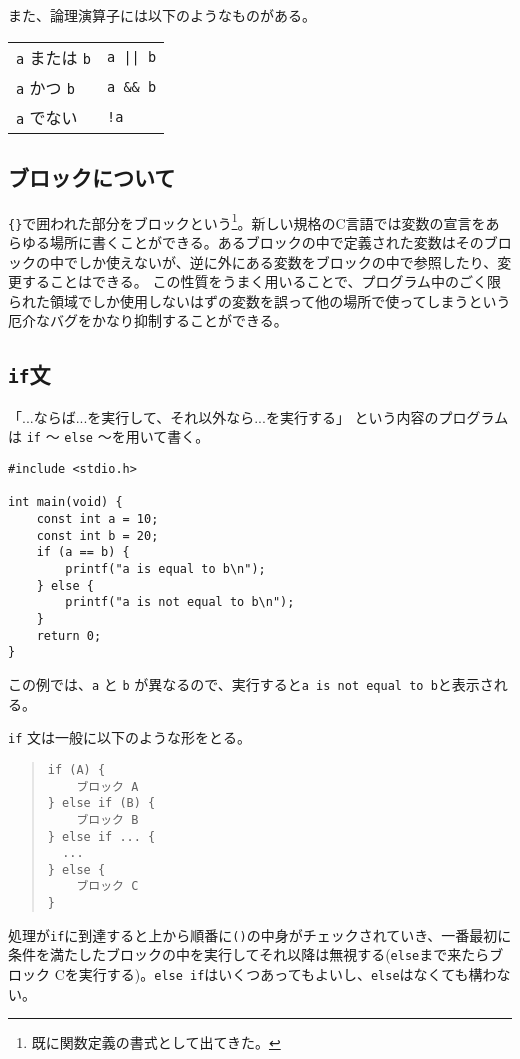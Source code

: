 また、論理演算子には以下のようなものがある。
\begin{table}[H]
    \centering
    \begin{tabular}{ll}
        \texttt{a} または \texttt{b} & \texttt{a || b}   \\
        \texttt{a} かつ \texttt{b}   & \texttt{a \&\& b} \\
        \texttt{a} でない            & \texttt{!a}       \\
    \end{tabular}
\end{table}

\subsection{ブロックについて}
\texttt{\{\}}で囲われた部分をブロックという\footnote{既に関数定義の書式として出てきた。}。新しい規格のC言語では変数の宣言をあらゆる場所に書くことができる。あるブロックの中で定義された変数はそのブロックの中でしか使えないが、逆に外にある変数をブロックの中で参照したり、変更することはできる。
この性質をうまく用いることで、プログラム中のごく限られた領域でしか使用しないはずの変数を誤って他の場所で使ってしまうという厄介なバグをかなり抑制することができる。

\subsection{\texttt{if}文}
「...ならば...を実行して、それ以外なら...を実行する」
という内容のプログラムは \texttt{if} 〜 \texttt{else} 〜を用いて書く。
\begin{reidai}\label{ex:if}
    \begin{verbatim}
#include <stdio.h>

int main(void) {
    const int a = 10;
    const int b = 20;
    if (a == b) {
        printf("a is equal to b\n");
    } else {
        printf("a is not equal to b\n");
    }
    return 0;
}
\end{verbatim}
\end{reidai} \noindent
この例では、\texttt{a} と \texttt{b} が異なるので、実行すると\texttt{a is not equal to b}と表示される。

\texttt{if} 文は一般に以下のような形をとる。
\begin{quote}
\begin{verbatim}
if (A) {
    ブロック A
} else if (B) {
    ブロック B
} else if ... {
  ...
} else {
    ブロック C
}
\end{verbatim}
\end{quote} \noindent
処理が\texttt{if}に到達すると上から順番に\texttt{()}の中身がチェックされていき、一番最初に条件を満たしたブロックの中を実行してそれ以降は無視する(\texttt{else}まで来たらブロック Cを実行する)。\texttt{else if}はいくつあってもよいし、\texttt{else}はなくても構わない。

